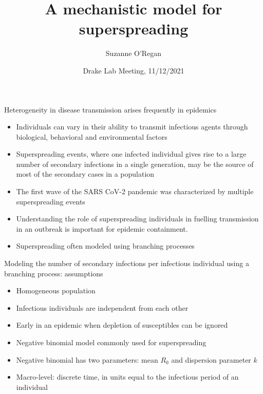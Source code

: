 \documentclass[
  ignorenonframetext,
]{beamer}
\title{A mechanistic model for superspreading}
\author{Suzanne O'Regan}
\date{Drake Lab Meeting, 11/12/2021}
\providecommand{\tightlist}{%
  \setlength{\itemsep}{0pt}\setlength{\parskip}{0pt}}
\begin{document}
\frame{\titlepage}

\begin{frame}{Heterogeneity in disease transmission arises frequently in
epidemics}
\protect\hypertarget{heterogeneity-in-disease-transmission-arises-frequently-in-epidemics}{}
\begin{itemize}
\tightlist
\item
  Individuals can vary in their ability to transmit infectious agents
  through biological, behavioral and environmental factors
\item
  Superspreading events, where one infected individual gives rise to a
  large number of secondary infections in a single generation, may be
  the source of most of the secondary cases in a population
\item
  The first wave of the SARS CoV-2 pandemic was characterized by
  multiple superspreading events
\item
  Understanding the role of superspreading individuals in fuelling
  transmission in an outbreak is important for epidemic containment.
\item
  Superspreading often modeled using branching processes
\end{itemize}
\end{frame}

\begin{frame}{Modeling the number of secondary infections per infectious
individual using a branching process: assumptions}
\protect\hypertarget{modeling-the-number-of-secondary-infections-per-infectious-individual-using-a-branching-process-assumptions}{}
\begin{itemize}
\tightlist
\item
  Homogeneous population
\item
  Infectious individuals are independent from each other
\item
  Early in an epidemic when depletion of susceptibles can be ignored
\item
  Negative binomial model commonly used for superspreading
\item
  Negative binomial has two parameters: mean \(R_0\) and dispersion
  parameter \(k\)
\item
  Macro-level: discrete time, in units equal to the infectious period of
  an individual
\end{itemize}
\end{frame}
\end{document}
